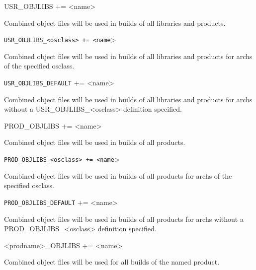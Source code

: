 \begin{description}\item {}USR\_OBJLIBS += \textless{}name\textgreater{}

\end{description}Combined object files will be used in builds of all libraries and products.

\begin{description}\item \verb|USR_OBJLIBS_<osclass> += <name|\textgreater{}

\end{description}Combined object files will be used in builds of all libraries and products for archs of the specified osclass.

\begin{description}\item \verb|USR_OBJLIBS_DEFAULT| += \textless{}name\textgreater{}

\end{description}Combined object files will be used in builds of all libraries and products for archs without a 
USR\_OBJLIBS\_\textless{}osclass\textgreater{} definition specified.



\begin{description}\item {}PROD\_OBJLIBS += \textless{}name\textgreater{}

\end{description}Combined object files will be used in builds of all products.

\begin{description}\item \verb|PROD_OBJLIBS_<osclass> += <name|\textgreater{}

\end{description}Combined object files will be used in builds of all products for archs of the specified osclass.

\begin{description}\item \verb|PROD_OBJLIBS_DEFAULT| += \textless{}name\textgreater{}

\end{description}Combined object files will be used in builds of all products for archs without a PROD\_OBJLIBS\_\textless{}osclass\textgreater{} 
definition specified.



\begin{description}\item \textless{}prodname\textgreater{}\_OBJLIBS += \textless{}name\textgreater{}

\end{description}Combined object files will be used for all builds of the named product.

